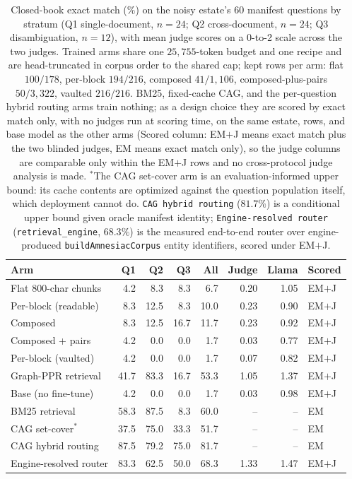 \documentclass{article}
\begin{document}
\begin{table}[t]
\centering
\caption{Closed-book exact match ($\%$) on the noisy estate's 60 manifest questions by stratum (Q1 single-document, $n{=}24$; Q2 cross-document, $n{=}24$; Q3 disambiguation, $n{=}12$), with mean judge scores on a 0-to-2 scale across the two judges. Trained arms share one $25{,}755$-token budget and one recipe and are head-truncated in corpus order to the shared cap; kept rows per arm: flat $100/178$, per-block $194/216$, composed $41/1{,}106$, composed-plus-pairs $50/3{,}322$, vaulted $216/216$. BM25, fixed-cache CAG, and the per-question hybrid routing arms train nothing; as a design choice they are scored by exact match only, with no judges run at scoring time, on the same estate, rows, and base model as the other arms (Scored column: EM$+$J means exact match plus the two blinded judges, EM means exact match only), so the judge columns are comparable only within the EM$+$J rows and no cross-protocol judge analysis is made. $^{\ast}$The CAG set-cover arm is an evaluation-informed upper bound: its cache contents are optimized against the question population itself, which deployment cannot do. \texttt{CAG hybrid routing} ($81.7\%$) is a conditional upper bound given oracle manifest identity; \texttt{Engine-resolved router} (\texttt{retrieval\_engine}, $68.3\%$) is the measured end-to-end router over engine-produced \texttt{buildAmnesiacCorpus} entity identifiers, scored under EM$+$J.}
\label{tab:k3}
\scriptsize
\setlength{\tabcolsep}{3pt}
\begin{tabular}{lrrrrrrl}
\toprule
Arm & Q1 & Q2 & Q3 & All & Judge & Llama & Scored \\
\midrule
Flat 800-char chunks & 4.2 & 8.3 & 8.3 & 6.7 & 0.20 & 1.05 & EM$+$J \\
Per-block (readable) & 8.3 & 12.5 & 8.3 & 10.0 & 0.23 & 0.90 & EM$+$J \\
Composed & 8.3 & 12.5 & 16.7 & 11.7 & 0.23 & 0.92 & EM$+$J \\
Composed + pairs & 4.2 & 0.0 & 0.0 & 1.7 & 0.03 & 0.77 & EM$+$J \\
Per-block (vaulted) & 4.2 & 0.0 & 0.0 & 1.7 & 0.07 & 0.82 & EM$+$J \\
Graph-PPR retrieval & 41.7 & 83.3 & 16.7 & 53.3 & 1.05 & 1.37 & EM$+$J \\
Base (no fine-tune) & 4.2 & 0.0 & 0.0 & 1.7 & 0.03 & 0.98 & EM$+$J \\
BM25 retrieval & 58.3 & 87.5 & 8.3 & 60.0 & -- & -- & EM \\
CAG set-cover$^{\ast}$ & 37.5 & 75.0 & 33.3 & 51.7 & -- & -- & EM \\
CAG hybrid routing & 87.5 & 79.2 & 75.0 & 81.7 & -- & -- & EM \\
Engine-resolved router & 83.3 & 62.5 & 50.0 & 68.3 & 1.33 & 1.47 & EM$+$J \\
\bottomrule
\end{tabular}
\end{table}
\end{document}

